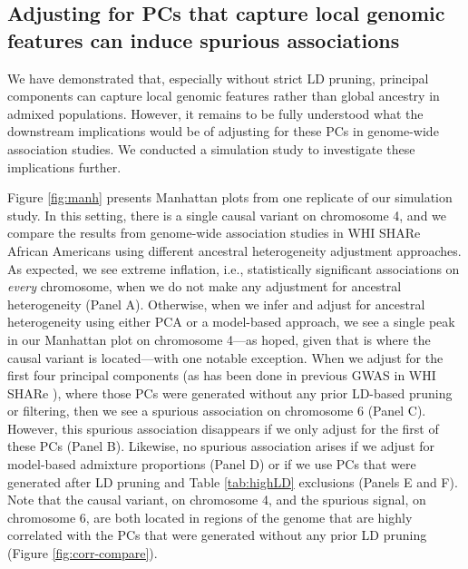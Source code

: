 \documentclass[12pt]{article}
\begin{document}
\subsection{Adjusting for PCs that capture local genomic features can induce spurious associations}

We have demonstrated that, especially without strict LD pruning, principal components can capture local genomic features rather than global ancestry in admixed populations.
However, it remains to be fully understood what the downstream implications would be of adjusting for these PCs in genome-wide association studies. 
We conducted a simulation study to investigate these implications further.

Figure \ref{fig:manh} presents Manhattan plots from one replicate of our simulation study.
In this setting, there is a single causal variant on chromosome 4, and we compare the results from genome-wide association studies in WHI SHARe African Americans using different ancestral heterogeneity adjustment approaches.
As expected, we see extreme inflation, i.e., statistically significant associations on \textit{every} chromosome, when we do not make any adjustment for ancestral heterogeneity (Panel A).
Otherwise, when we infer and adjust for ancestral heterogeneity using either PCA or a model-based approach, we see a single peak in our Manhattan plot on chromosome 4---as hoped, given that is where the causal variant is located---with one notable exception.
When we adjust for the first four principal components (as has been done in previous GWAS in WHI SHARe \citep{reiner2012, carty2012}), where those PCs were generated without any prior LD-based pruning or filtering, then we see a spurious association on chromosome 6 (Panel C).
However, this spurious association disappears if we only adjust for the first of these PCs (Panel B).
Likewise, no spurious association arises if we adjust for model-based admixture proportions (Panel D) or if we use PCs that were generated after LD pruning and Table \ref{tab:highLD} exclusions (Panels E and F).
Note that the causal variant, on chromosome 4, and the spurious signal, on chromosome 6, are both located in regions of the genome that are highly correlated with the PCs that were generated without any prior LD pruning (Figure \ref{fig:corr-compare}).
\end{document}
